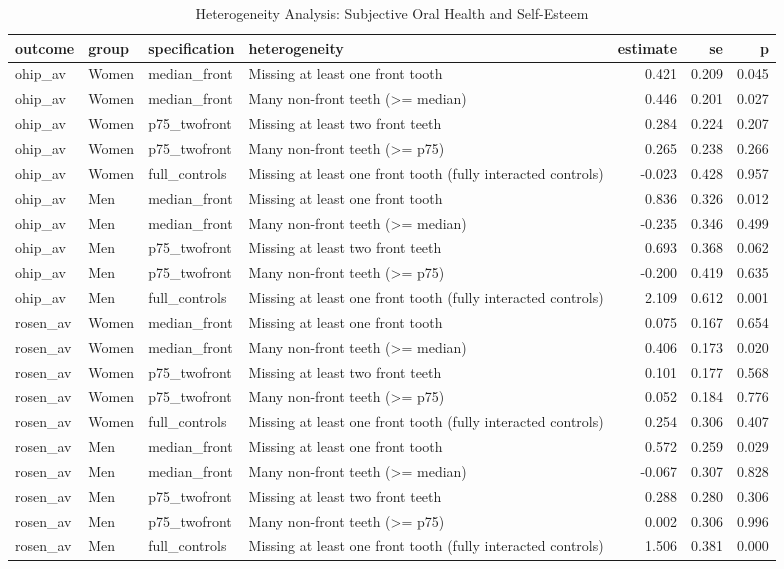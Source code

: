 \begin{table}

\caption{Heterogeneity Analysis: Subjective Oral Health and Self-Esteem}
\centering
\begin{tabular}[t]{llllrrr}
\toprule
outcome & group & specification & heterogeneity & estimate & se & p\\
\midrule
ohip\_av & Women & median\_front & Missing at least one front tooth & 0.421 & 0.209 & 0.045\\
ohip\_av & Women & median\_front & Many non-front teeth (>= median) & 0.446 & 0.201 & 0.027\\
ohip\_av & Women & p75\_twofront & Missing at least two front teeth & 0.284 & 0.224 & 0.207\\
ohip\_av & Women & p75\_twofront & Many non-front teeth (>= p75) & 0.265 & 0.238 & 0.266\\
ohip\_av & Women & full\_controls & Missing at least one front tooth (fully interacted controls) & -0.023 & 0.428 & 0.957\\
\addlinespace
ohip\_av & Men & median\_front & Missing at least one front tooth & 0.836 & 0.326 & 0.012\\
ohip\_av & Men & median\_front & Many non-front teeth (>= median) & -0.235 & 0.346 & 0.499\\
ohip\_av & Men & p75\_twofront & Missing at least two front teeth & 0.693 & 0.368 & 0.062\\
ohip\_av & Men & p75\_twofront & Many non-front teeth (>= p75) & -0.200 & 0.419 & 0.635\\
ohip\_av & Men & full\_controls & Missing at least one front tooth (fully interacted controls) & 2.109 & 0.612 & 0.001\\
\addlinespace
rosen\_av & Women & median\_front & Missing at least one front tooth & 0.075 & 0.167 & 0.654\\
rosen\_av & Women & median\_front & Many non-front teeth (>= median) & 0.406 & 0.173 & 0.020\\
rosen\_av & Women & p75\_twofront & Missing at least two front teeth & 0.101 & 0.177 & 0.568\\
rosen\_av & Women & p75\_twofront & Many non-front teeth (>= p75) & 0.052 & 0.184 & 0.776\\
rosen\_av & Women & full\_controls & Missing at least one front tooth (fully interacted controls) & 0.254 & 0.306 & 0.407\\
\addlinespace
rosen\_av & Men & median\_front & Missing at least one front tooth & 0.572 & 0.259 & 0.029\\
rosen\_av & Men & median\_front & Many non-front teeth (>= median) & -0.067 & 0.307 & 0.828\\
rosen\_av & Men & p75\_twofront & Missing at least two front teeth & 0.288 & 0.280 & 0.306\\
rosen\_av & Men & p75\_twofront & Many non-front teeth (>= p75) & 0.002 & 0.306 & 0.996\\
rosen\_av & Men & full\_controls & Missing at least one front tooth (fully interacted controls) & 1.506 & 0.381 & 0.000\\
\bottomrule
\end{tabular}
\end{table}
